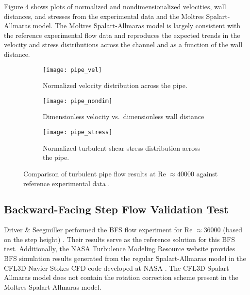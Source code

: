 Figure \ref{fig:pipe-verification} shows plots of normalized and nondimensionalized velocities,
wall distances, and stresses from the experimental data \cite{laufer_structure_1954}
and the Moltres Spalart-Allmaras model. The Moltres Spalart-Allmaras model is largely consistent with the reference
experimental flow data and reproduces the expected trends in the velocity and stress distributions
across the channel and as a function of the wall distance.

\begin{figure}[htb]
  \centering
  \begin{subfigure}[b]{0.48\columnwidth}
    \centering
    \texttt{[image: pipe\_vel]}
    \caption{Normalized velocity distribution across the pipe.}
    \label{fig:pipe-vel}
  \end{subfigure}
  \hfill
  \begin{subfigure}[b]{0.48\columnwidth}
    \centering
    \texttt{[image: pipe\_nondim]}
    \caption{Dimensionless velocity vs.\ dimensionless wall distance}
    \label{fig:pipe-nondim}
  \end{subfigure}
  \begin{subfigure}[b]{0.48\columnwidth}
    \centering
    \texttt{[image: pipe\_stress]}
    \caption{Normalized turbulent shear stress distribution across the pipe.}
    \label{fig:pipe-stress}
  \end{subfigure}
  \caption{Comparison of turbulent pipe flow results at Re $\approx 40000$ against reference
  experimental data \cite{laufer_structure_1954}.}
  \label{fig:pipe-verification}
\end{figure}

\FloatBarrier

\subsection{Backward-Facing Step Flow Validation Test}

Driver \& Seegmiller performed the \gls{BFS} flow experiment for Re $\approx36000$ (based on the
step height)
\cite{driver_features_1985}. Their results serve as the reference solution for this \gls{BFS} test.
Additionally, the \gls{NASA} Turbulence Modeling Resource website \cite{rumsey_turbulence_nodate}
provides \gls{BFS} simulation results generated from the regular Spalart-Allmaras model in the CFL3D
Navier-Stokes CFD code developed at \gls{NASA} \cite{krist_cfl3d_1998}. The CFL3D Spalart-Allmaras model
does not contain the rotation correction scheme
\cite{aupoix_extensions_2003, dacles-mariani_numericalexperimental_1995} present in the Moltres
Spalart-Allmaras model.

